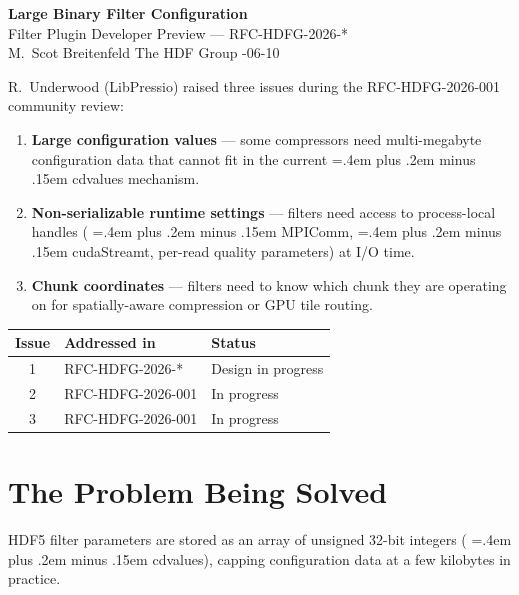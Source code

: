 \documentclass[11pt,letterpaper]{article}
\renewcommand{\texttt}[1]{\begingroup\small\ttfamily\hyphenchar\font=45
  \spaceskip=.4em plus .2em minus .15em #1\endgroup}
\renewcommand{\_}{\oldtextunderscore\allowbreak}
\begin{document}
\begin{center}
  {\LARGE\bfseries Large Binary Filter Configuration}\\[4pt]
  {\large Filter Plugin Developer Preview --- RFC-HDFG-2026-*}\\[6pt]
  {\small M.\ Scot Breitenfeld \quad\textbullet\quad The HDF Group \quad\textbullet{}-06-10}
\end{center}

\bigskip

R.~Underwood (LibPressio) raised three issues during the
RFC-HDFG-2026-001 community review:

\begin{enumerate}[noitemsep]
  \item \textbf{Large configuration values} --- some compressors need
        multi-megabyte configuration data that cannot fit in the
        current \texttt{cd\_values} mechanism.
  \item \textbf{Non-serializable runtime settings} --- filters need
        access to process-local handles (\texttt{MPI\_Comm},
        \texttt{cudaStream\_t}, per-read quality parameters) at I/O
        time.
  \item \textbf{Chunk coordinates} --- filters need to know which
        chunk they are operating on for spatially-aware compression or
        GPU tile routing.
\end{enumerate}

\begin{center}
\small
\begin{tabular}{@{}cll@{}}
\toprule
\textbf{Issue} & \textbf{Addressed in} & \textbf{Status} \\
\midrule
1 & RFC-HDFG-2026-*  & Design in progress \\
2 & RFC-HDFG-2026-001                 & In progress \\
3 & RFC-HDFG-2026-001                 & In progress \\
\bottomrule
\end{tabular}
\end{center}

\section*{The Problem Being Solved}

HDF5 filter parameters are stored as an array of unsigned 32-bit integers
(\texttt{cd\_values}), capping configuration data at a few kilobytes in
practice.
\end{document}

